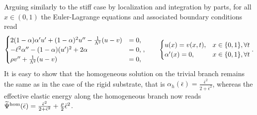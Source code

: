 \documentclass[10pt]{article}
\begin{document}
Arguing similarly to the stiff case by localization and integration by parts, for all $x \in (0, 1)$ the Euler-Lagrange equations and associated boundary conditions read
\begin{eqnarray}
    \label{modeld_el_1}
    \begin{cases}
        2(1-\alpha)\alpha' u' +(1-\alpha)^2 u'' -  \frac{1}{\Lambda^2}(u-v) & = 0, \\
        -\ell^2\alpha'' - (1-\alpha)( u')^2 + 2\alpha                         & = 0, \\
        \rho  v''  +  \frac{1}{\Lambda^2}(u-v)                  & = 0, \\
    \end{cases}
    ,    \qquad
    \begin{cases}
        u(x)       = v(x, t), & x\in\{0, 1\}, \forall t \\
        \alpha'(x) = 0,            & x\in\{0, 1\}, \forall t \\
    \end{cases}
    .
    \label{auto2}
\end{eqnarray}
It is easy to show that the homogeneous solution on the trivial branch remains the same as in the case of the rigid substrate, that is $\alpha_h(\bar{\epsilon}) = \frac{\bar{\epsilon}^2}{2 + \bar{\epsilon}^2}\label{eq:homo11}$, whereas the effective elastic energy along the homogeneous branch now reads $\widetilde\Psi^\text{hom}(\bar{\epsilon}) = \frac{\bar{\epsilon}^2}{2 + \bar{\epsilon}^2} + \frac{\rho}{2}\bar{\epsilon}^2$.
\end{document}
